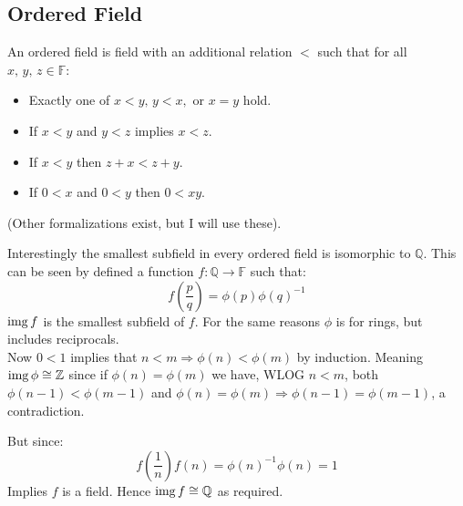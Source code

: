 \subsection{Ordered Field}
An ordered field is field with an additional relation $<$ such that for all $x,\,y,\,z\in\mathbb{F}$:
\begin{itemize}
	\item Exactly one of $x<y,\,y<x,$ or $x=y$ hold.
	\item If $x<y$ and $y<z$ implies $x<z$.
	\item If $x<y$ then  $z+x<z+y$.
	\item If $0<x$ and $0<y$ then $0<xy$.
\end{itemize}
(Other formalizations exist, but I will use these).

Interestingly the smallest subfield in every ordered field is isomorphic to $\mathbb{Q}$.
This can be seen by defined a function $f:\mathbb{Q}\rightarrow \mathbb{F}$ such that:
\[f\left(\frac{p}{q}\right) = \phi(p)\phi(q)^{-1}\]
$\operatorname{img} f$ is the smallest subfield of $f$.
For the same reasons $\phi$ is for rings,
but includes reciprocals.
\\

Now $0<1$ implies that $n<m \Rightarrow \phi(n)<\phi(m)$ by induction.
Meaning $\operatorname{img} \phi \cong \mathbb{Z}$ since if $\phi(n)=\phi(m)$ we have, WLOG $n<m$, both $\phi(n-1) < \phi(m-1)$ and $\phi(n) = \phi(m)\Rightarrow \phi(n-1) = \phi(m-1)$,
a contradiction.

But since:
\[f\left(\frac{1}{n}\right)f(n) = \phi(n)^{-1}\phi(n) = 1\]
Implies $f$ is a field.
Hence $\operatorname{img} f \cong \mathbb{Q}$ as required.
